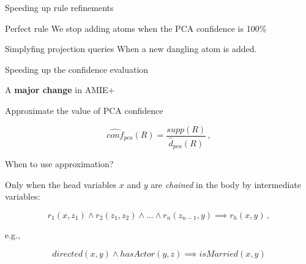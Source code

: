 \documentclass[xcolor={x11names}]{beamer}
\begin{document}
\begin{frame}{Speeding up rule refinements}

    \begin{block}{Perfect rule}
        We stop adding atoms when the PCA confidence is 100\%
	\end{block}

    \begin{block}{Simplyfing projection queries}
        When a new dangling atom is added.
	\end{block}

\end{frame}

\begin{frame}{Speeding up the confidence evaluation}

    \begin{block}{}
        A \textbf{major change} in AMIE+ 
	\end{block}

    \begin{block}{Approximate the value of PCA confidence}
	\end{block}

    \begin{equation}
        \label{eq:approx_stand_conf}
        \widehat{conf}_{pca}(R) = \dfrac{supp(R)}{\widehat{d}_{pca}(R)}\,,
    \end{equation}

\end{frame}

\begin{frame}{When to use approximation?}
    \begin{block}{}
        Only when the head variables $x$ and $y$ are \textit{chained}
        in the body by intermediate variables:
	\end{block}
    \begin{equation}
        \label{eq:candidate_for_approx}
        r_1(x, z_1) \land r_2(z_1, z_2) \land \ldots \land r_n(z_{n-1}, y) \implies r_h(x, y)\,,
    \end{equation}

    e.g.,

    \begin{equation}
        directed(x, y) \land hasActor(y, z) \implies isMarried(x, y)
    \end{equation}

\end{frame}
\end{document}
